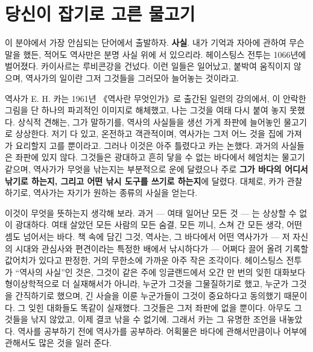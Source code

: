 \section*{당신이 잡기로 고른 물고기}

이 분야에서 가장 안심되는 단어에서 출발하자. \textbf{사실}. 내가 기억과 자아에 관하여 무슨 말을 했든, 적어도 역사만은 분명 사실 위에 서 있으리라. 헤이스팅스 전투는 1066년에 벌어졌다. 카이사르는 루비콘강을 건넜다. 이런 일들은 일어났고, 붙박여 움직이지 않으며, 역사가의 일이란 그저 그것들을 그러모아 늘어놓는 것이라고.

역사가 E. H. 카는 1961년 《역사란 무엇인가》로 출간된 일련의 강의에서, 이 안락한 그림을 단 하나의 파괴적인 이미지로 해체했고, 나는 그것을 여태 다시 붙여 놓지 못했다. 상식적 견해는, 그가 말하기를, 역사의 사실들을 생선 가게 좌판에 늘어놓인 물고기로 상상한다. 저기 다 있고, 온전하고 객관적이며, 역사가는 그저 어느 것을 집에 가져가 요리할지 고를 뿐이라고. 그러나 이것은 아주 틀렸다고 카는 논했다. 과거의 사실들은 좌판에 있지 않다. 그것들은 광대하고 흔히 닿을 수 없는 바다에서 헤엄치는 물고기 같으며, 역사가가 무엇을 낚는지는 부분적으로 운에 달렸으나 주로 \textbf{그가 바다의 어디서 낚기로 하는지, 그리고 어떤 낚시 도구를 쓰기로 하는지}에 달렸다. 대체로, 카가 관찰하기로, 역사가는 자기가 원하는 종류의 사실을 얻는다.

이것이 무엇을 뜻하는지 생각해 보라. 과거 — 여태 일어난 모든 것 — 는 상상할 수 없이 광대하다. 여태 살았던 모든 사람의 모든 숨결, 모든 끼니, 스쳐 간 모든 생각, 어떤 셈도 넘어서는 바다. 책 속에 담긴 그것, 역사는, 그 바다에서 어떤 역사가가 — 저 자신의 시대와 관심사와 편견이라는 특정한 배에서 낚시하다가 — 어쩌다 끌어 올려 기록할 값어치가 있다고 판정한, 거의 무한소에 가까운 아주 작은 조각이다. 헤이스팅스 전투가 ``역사의 사실''인 것은, 그것이 같은 주에 잉글랜드에서 오간 만 번의 잊힌 대화보다 형이상학적으로 더 실재해서가 아니라, 누군가 그것을 그물질하기로 했고, 누군가 그것을 간직하기로 했으며, 긴 사슬을 이룬 누군가들이 그것이 중요하다고 동의했기 때문이다. 그 잊힌 대화들도 똑같이 실재했다. 그것들은 그저 좌판에 없을 뿐이다. 아무도 그것들을 낚지 않았고, 이제 결코 낚을 수 없기에. 그래서 카는 그 유명한 조언을 내놓았다. 역사를 공부하기 전에 역사가를 공부하라. 어획물은 바다에 관해서만큼이나 어부에 관해서도 많은 것을 일러 준다.

